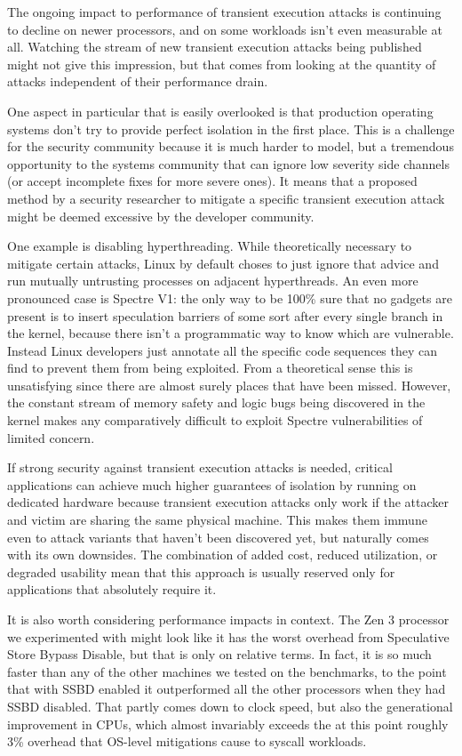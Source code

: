 \label{s:discussion}
The ongoing impact to performance of transient execution attacks is continuing to decline on newer processors, and on some workloads isn't even measurable at all.
Watching the stream of new transient execution attacks being published might not give this impression, but that comes from looking at the quantity of attacks independent of their performance drain.

One aspect in particular that is easily overlooked is that production operating systems don't try to provide perfect isolation in the first place.
This is a challenge for the security community because it is much harder to model, but a tremendous opportunity to the systems community that can ignore low severity side channels (or accept incomplete fixes for more severe ones).
It means that a proposed method by a security researcher to mitigate a specific transient execution attack might be deemed excessive by the developer community.

One example is disabling hyperthreading.
While theoretically necessary to mitigate certain attacks, Linux by default choses to just ignore that advice and run mutually untrusting processes on adjacent hyperthreads.
An even more pronounced case is Spectre V1: the only way to be 100\% sure that no gadgets are present is to insert speculation barriers of some sort after every single branch in the kernel, because there isn't a programmatic way to know which are vulnerable.
Instead Linux developers just annotate all the specific code sequences they can find to prevent them from being exploited.
From a theoretical sense this is unsatisfying since there are almost surely places that have been missed.
However, the constant stream of memory safety and logic bugs being discovered in the kernel makes any comparatively difficult to exploit Spectre vulnerabilities of limited concern.

If strong security against transient execution attacks is needed, critical applications can achieve much higher guarantees of isolation by running on dedicated hardware because transient execution attacks only work if the attacker and victim are sharing the same physical machine.
This makes them immune even to attack variants that haven't been discovered yet, but naturally comes with its own downsides.
The combination of added cost, reduced utilization, or degraded usability mean that this approach is usually reserved only for applications that absolutely require it.

It is also worth considering performance impacts in context.
The Zen 3 processor we experimented with might look like it has the worst overhead from Speculative Store Bypass Disable, but that is only on relative terms.
In fact, it is so much faster than any of the other machines we tested on the benchmarks, to the point that with SSBD enabled it outperformed all the other processors when they had SSBD disabled.
That partly comes down to clock speed, but also the generational improvement in CPUs, which almost invariably exceeds the at this point roughly 3\% overhead that OS-level mitigations cause to syscall workloads.

